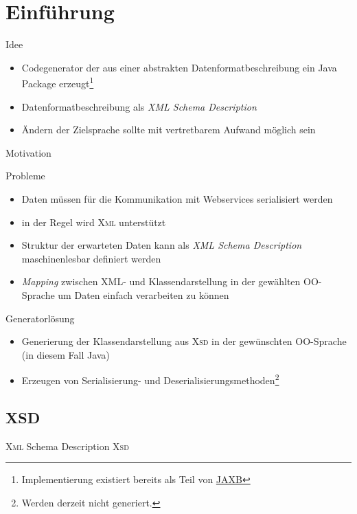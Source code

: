 \section{Einführung}

\begin{frame}{Idee}
    \begin{itemize}
        \item Codegenerator der aus einer abstrakten Datenformatbeschreibung ein Java Package erzeugt\footnote{Implementierung existiert bereits als Teil von \href{https://jaxb.java.net/}{JAXB}}
        \item Datenformatbeschreibung als \emph{XML Schema Description}
        \item Ändern der Zielsprache sollte mit vertretbarem Aufwand möglich sein
    \end{itemize}
\end{frame}

\begin{frame}[squeeze]{Motivation}
    \begin{block}{Probleme}
        \begin{itemize}
            \item Daten müssen für die Kommunikation mit Webservices serialisiert werden
            \item in der Regel wird \textsc{Xml} unterstützt
            \item Struktur der erwarteten Daten kann als \emph{XML Schema Description} maschinenlesbar definiert werden
            \item \emph{Mapping} zwischen XML- und Klassendarstellung in der gewählten OO-Sprache um Daten einfach verarbeiten zu können
        \end{itemize}
    \end{block}
        \begin{block}{Generatorlösung}
        \begin{itemize}
            \item Generierung der Klassendarstellung aus \textsc{Xsd} in der gewünschten OO-Sprache (in diesem Fall Java)
            \item Erzeugen von Serialisierung- und Deserialisierungsmethoden\footnote{Werden derzeit nicht generiert.}
        \end{itemize}
        \end{block}
\end{frame}

\subsection{XSD}
\begin{frame}{\textsc{Xml} Schema Description \textendash{} \textsc{Xsd}}

\end{frame}

